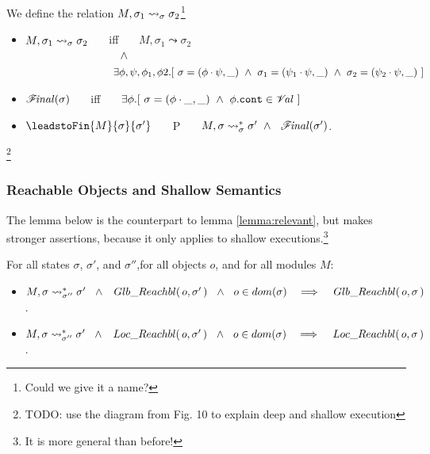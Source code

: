{
\begin{definition}
\label{def:shallow:term}
We define the relation  $M, \sigma_1 \leadsto_{\sigma} \sigma_2$\footnote{Could we give it a name? }
\begin{itemize}
\item
$M, \sigma_1 \leadsto_{\sigma} \sigma_2$ \ \ \ iff \ \ \  ${M, \sigma_1} \leadsto {\sigma_2}$\\
$\strut  \hspace{3cm} \wedge $\\
$\strut  \hspace{2.7cm}\ \    \exists \phi,\psi, \phi_1, \phi2.[ \ \sigma = (\phi\cdot\psi,\_) \ \wedge \ \sigma_1 = (\psi_1\cdot \psi, \_)
\ \wedge\ \sigma_2 = (\psi_2\cdot \psi, \_)\ ] $ 
\item
${\mathcal F}\!\mathit{inal}(\sigma)$ \ \ \ iff \ \ \  $\exists \phi. [\ \sigma = (\phi\cdot\_,\_) \ \wedge \ \phi.\texttt{cont} \in {\mathcal V}\!\mathit{al} \ ]$
\item
$\leadstoFin {M} {\sigma} {\sigma'}$ \ \ \ P \ \ \  $\leadstoRecStar {M} {\sigma} {\sigma} {\sigma'} \ \wedge \ \ \Final{\sigma'}$.
\end{itemize}
\end{definition}
}
\footnote{TODO: use the diagram from Fig. 10 to explain deep and shallow execution}

\subsubsection{{Reachable  Objects and Shallow Semantics}}


The lemma below is the counterpart to lemma \ref{lemma:relevant}, but makes stronger assertions, because it only applies to shallow executions.\footnote{{It is more general than before!}}

\begin{lemma}
For all states $\sigma$, $\sigma'$, and $\sigma''$,for all objects $o$, and for all modules  $M$:
\begin{itemize}
\item
${\leadstoRecStar {M}  {\sigma} {\sigma''} {\sigma'}} \ \ \wedge \ \  \GRelevant o {\sigma'} \ \ \wedge\ \ o\in dom(\sigma)\ \ \ \Longrightarrow \ \  \ \GRelevant o {\sigma}$.
\item
${\leadstoRecStar {M}  {\sigma}  {\sigma''} {\sigma'}} \ \ \wedge \ \   \LRelevant o {\sigma'}\  \ \wedge\ \ o\in dom(\sigma)\ \ \ \Longrightarrow \ \ \ \LRelevant o {\sigma}$.
\end{itemize}
\end{lemma}



